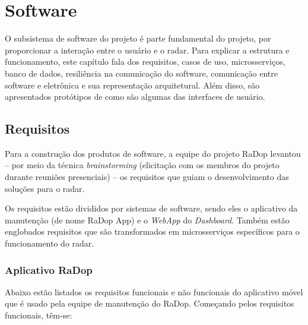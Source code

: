 \chapter{Software}

O subsistema de software do projeto é parte fundamental do projeto, por proporcionar a interação entre o usuário e o radar. Para explicar a estrutura e funcionamento, este capítulo fala dos requisitos, casos de uso, microsserviços, banco de dados, resiliência na comunicação do software, comunicação entre software e eletrônica e sua representação arquitetural. Além disso, são apresentados protótipos de como são algumas das interfaces de usuário.

\section{Requisitos}

Para a construção dos produtos de software, a equipe do projeto RaDop levantou -- por meio da técnica \textit{brainstorming} (elicitação com os membros do projeto durante reuniões presenciais) -- os requisitos que guiam o desenvolvimento das soluções para o radar.

Os requisitos estão divididos por sistemas de software, sendo eles o aplicativo da manutenção (de nome RaDop App) e o \textit{WebApp} do \textit{Dashboard}. Também estão englobados requisitos que são transformados em microsserviços específicos para o funcionamento do radar.

\subsection{Aplicativo RaDop}

Abaixo estão listados os requisitos funcionais e não funcionais do aplicativo móvel que é usado pela equipe de manutenção do RaDop. Começando pelos requisitos funcionais, têm-se:

